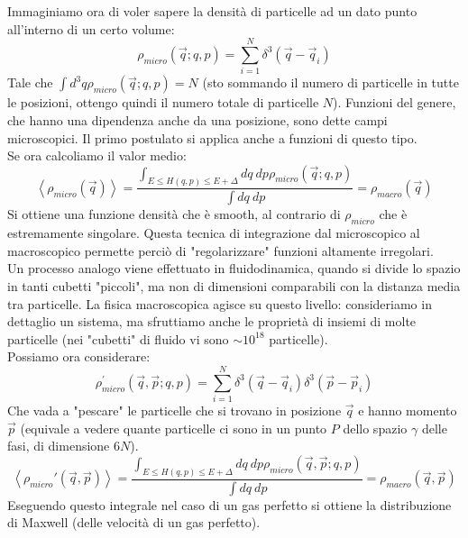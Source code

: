 \documentclass[12pt]{article}
\begin{document}
Immaginiamo ora di voler sapere la densità di particelle ad un dato punto all'interno di un certo volume:
\[
\rho_{micro}\left(\vec{q};q,p\right)=\sum_{i=1}^{N}{\delta^3\left(\vec{q}-{\vec{q}}_i\right)}
\]
Tale che $\int d^3q  \rho_{micro}\left(\vec{q};q,p\right)=N$ (sto sommando il numero di particelle in tutte le posizioni, ottengo quindi il numero totale di particelle $N$).
Funzioni del genere, che hanno una dipendenza anche da una posizione, sono dette campi microscopici. Il primo postulato si applica anche a funzioni di questo tipo.\\
Se ora calcoliamo il valor medio:
\[
\left\langle\rho_{micro}(\vec{q})\right\rangle=\frac{\int_{E\le H\left(q,p\right)\le E+\Delta}{dq\ dp}\rho_{micro}\left(\vec{q};q,p\right)}{\int{dq\ dp}}= \rho_{macro}(\vec{q})
\]
Si ottiene una funzione densità che è smooth, al contrario di $\rho_{micro}$ che è estremamente singolare. Questa tecnica di integrazione dal microscopico al macroscopico permette perciò di "regolarizzare" funzioni altamente irregolari.\\
Un processo analogo viene effettuato in fluidodinamica, quando si divide lo spazio in tanti cubetti "piccoli", ma non di dimensioni comparabili con la distanza media tra particelle. La fisica macroscopica agisce su questo livello: consideriamo in dettaglio un sistema, ma sfruttiamo anche le proprietà di insiemi di molte particelle (nei "cubetti" di fluido vi sono ${\sim 10}^{18}$ particelle).\\

Possiamo ora considerare:
\[
\rho_{micro}^\prime\left(\vec{q},\vec{p};q,p\right)= \sum_{i=1}^{N}{\delta^3\left(\vec{q}-{\vec{q}}_i\right)\delta^3(\vec{p}-{\vec{p}}_i)}
\]
Che vada a "pescare" le particelle che si trovano in posizione $\vec{q}$ e hanno momento $\vec{p}$ (equivale a vedere quante particelle ci sono in un punto $P$ dello spazio $\gamma$ delle fasi, di dimensione $6N$).
\[
\left\langle\rho_{micro}\prime(\vec{q},\vec{p})\right\rangle=\frac{\int_{E\le H\left(q,p\right)\le E+\Delta}{dq\ dp}\rho_{micro}\left(\vec{q},\vec{p};q,p\right)}{\int{dq\ dp}}=\rho_{macro}(\vec{q},\vec{p})
\]
Eseguendo questo integrale nel caso di un gas perfetto si ottiene la  distribuzione di Maxwell (delle velocità di un gas perfetto).
\end{document}
